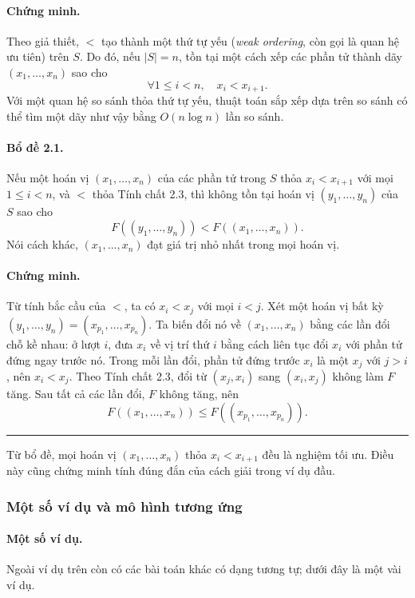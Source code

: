 \documentclass[11pt]{article}
\begin{document}
\paragraph{Chứng minh.}
Theo giả thiết, $<$ tạo thành một thứ tự yếu (\emph{weak ordering}, còn gọi là
quan hệ ưu tiên) trên $S$. Do đó, nếu $|S|=n$, tồn tại một cách xếp các phần tử
thành dãy $(x_1,\ldots,x_n)$ sao cho
\[
  \forall 1\le i<n,\quad x_i<x_{i+1}.
\]
Với một quan hệ so sánh thỏa thứ tự yếu, thuật toán sắp xếp dựa trên so sánh có
thể tìm một dãy như vậy bằng $O(n\log n)$ lần so sánh.

\paragraph{Bổ đề 2.1.}
Nếu một hoán vị $(x_1,\ldots,x_n)$ của các phần tử trong $S$ thỏa
$x_i<x_{i+1}$ với mọi $1\le i<n$, và $<$ thỏa Tính chất 2.3, thì không tồn tại
hoán vị $(y_1,\ldots,y_n)$ của $S$ sao cho
\[
  F((y_1,\ldots,y_n))<F((x_1,\ldots,x_n)).
\]
Nói cách khác, $(x_1,\ldots,x_n)$ đạt giá trị nhỏ nhất trong mọi hoán vị.

\paragraph{Chứng minh.}
Từ tính bắc cầu của $<$, ta có $x_i<x_j$ với mọi $i<j$. Xét một hoán vị bất kỳ
$(y_1,\ldots,y_n)=(x_{p_1},\ldots,x_{p_n})$. Ta biến đổi nó về
$(x_1,\ldots,x_n)$ bằng các lần đổi chỗ kề nhau: ở lượt $i$, đưa $x_i$ về vị
trí thứ $i$ bằng cách liên tục đổi $x_i$ với phần tử đứng ngay trước nó. Trong
mỗi lần đổi, phần tử đứng trước $x_i$ là một $x_j$ với $j>i$, nên $x_i<x_j$.
Theo Tính chất 2.3, đổi từ $(x_j,x_i)$ sang $(x_i,x_j)$ không làm $F$ tăng. Sau
tất cả các lần đổi, $F$ không tăng, nên
\[
  F((x_1,\ldots,x_n))\le F((x_{p_1},\ldots,x_{p_n})).
\]
\hfill\rule{0.55em}{0.55em}

Từ bổ đề, mọi hoán vị $(x_1,\ldots,x_n)$ thỏa $x_i<x_{i+1}$ đều là nghiệm tối
ưu. Điều này cũng chứng minh tính đúng đắn của cách giải trong ví dụ đầu.

\subsubsection{Một số ví dụ và mô hình tương ứng}

\paragraph{Một số ví dụ.}
Ngoài ví dụ trên còn có các bài toán khác có dạng tương tự; dưới đây là một vài
ví dụ.
\end{document}
